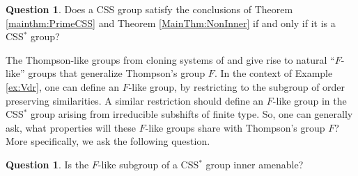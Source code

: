 \documentclass[12pt]{amsart}
\numberwithin{equation}{subsection}
\theoremstyle{definition}
\theoremstyle{definition}
\newtheorem{question}[theorem]{Question}
\theoremstyle{remark}
\begin{document}
\begin{question}
    Does a CSS group satisfy the conclusions of Theorem \ref{mainthm:PrimeCSS} and Theorem \ref{MainThm:NonInner} if and only if it is a CSS$^*$ group?
\end{question}

The Thompson-like groups from cloning systems of \cite{witzel2018thompson} and \cite{skipper2021almost} give rise to natural ``$F$-like'' groups that generalize Thompson's group $F$. In the context of Example \ref{ex:Vdr}, one can define an $F$-like group, by restricting to the subgroup of order preserving similarities. A similar restriction should define an $F$-like group in the CSS$^*$ group arising from irreducible subshifts of finite type. So, one can generally ask, what properties will these $F$-like groups share with Thompson's group $F$? More specifically, we ask the following question.

\begin{question}
Is the $F$-like subgroup of a CSS$^*$ group inner amenable?
\end{question}



\end{document}
